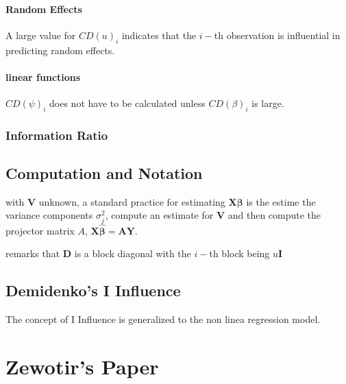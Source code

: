 \documentclass[12pt, a4paper]{article}
\begin{document}
\newpage
\subsubsection{Random Effects}


A large value for $CD(u)_i$ indicates that the $i-$th observation is influential in predicting random effects.


\subsubsection{linear functions}


$CD(\psi)_i$ does not have to be calculated unless $CD(\beta)_i$ is large.




\subsection{Information Ratio}




\newpage
\section{Computation and Notation } %
with $\boldsymbol{V}$ unknown, a standard practice for estimating $\boldsymbol{X \beta}$ is the estime the variance components $\sigma^2_j$,
compute an estimate for $\boldsymbol{V}$ and then compute the projector matrix $A$, $\boldsymbol{X \hat{\beta}}  = \boldsymbol{AY}$.




\citet{zewotir} remarks that $\boldsymbol{D}$ is a block diagonal with the $i-$th block being $u \boldsymbol{I}$




\section{Demidenko's I Influence} %
The concept of I Influence is generalized  to the non linea regression model.
\chapter{Zewotir's Paper}
\end{document}
